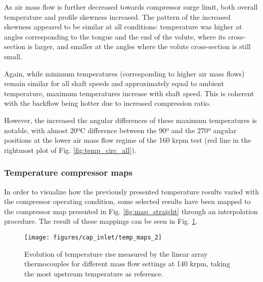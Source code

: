 As air mass flow is further decreased towards compressor surge limit, both overall temperature and profile skewness increased. The pattern of the increased skewness appeared to be similar at all conditions: temperature was higher at angles corresponding to the tongue and the end of the volute, where its cross-section is larger, and smaller at the angles where the volute cross-section is still small.

Again, while minimum temperatures (corresponding to higher air mass flows) remain similar for all shaft speeds and approximately equal to ambient temperature, maximum temperatures increase with shaft speed. This is coherent with the backflow being hotter due to increased compression ratio.

However, the increased the angular differences of these maximum temperatures is notable, with almost 20ºC difference between the 90º and the 270º angular positions at the lower air mass flow regime of the 160 krpm test (red line in the rightmost plot of Fig. \ref{fig:temp_circ_all}).

\subsubsection{Temperature compressor maps}

In order to visualize how the previously presented temperature results varied with the compressor operating condition, some selected results have been mapped to the compressor map presented in Fig. \ref{fig:map_straight} through an interpolation procedure. The result of these mappings can be seen in Fig. \ref{fig:temp_maps}.

\begin{figure}[htb!]
\centering
\texttt{[image: figures/cap\_inlet/temp\_maps\_2]}
\caption{Evolution of temperature rise measured by the linear array thermocouples for different mass flow settings at 140 krpm, taking the most upstream temperature as reference.}
\label{fig:temp_maps}
\end{figure}


